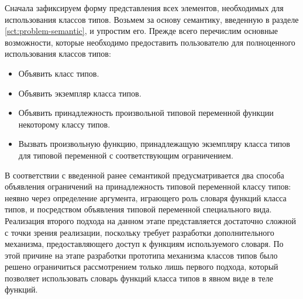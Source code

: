 Сначала зафиксируем форму представления всех элементов, необходимых для использования классов типов. Возьмем за основу семантику, введенную в разделе \ref{sct:problem-semantic}, и упростим его. Прежде всего перечислим основные возможности, которые необходимо предоставить пользователю для полноценного использования классов типов:
\begin{itemize}    
    \item Объявить класс типов.
    \item Объявить экземпляр класса типов.
    \item Объявить принадлежность произвольной типовой переменной функции некоторому классу типов.
    \item Вызвать произвольную функцию, принадлежащую экземпляру класса типов для типовой переменной с соответствующим ограничением.   
\end{itemize}
В соответствии с введенной ранее семантикой предусматривается два способа объявления ограничений на принадлежность типовой переменной классу типов: неявно через определение аргумента, играющего роль словаря функций класса типов, и посредством объявления типовой переменной специального вида. Реализация второго подхода на данном этапе представляется достаточно сложной с точки зрения реализации, поскольку требует разработки дополнительного механизма, предоставляющего доступ к функциям используемого словаря. По этой причине на этапе разработки прототипа механизма классов типов было решено ограничиться рассмотрением только лишь первого подхода, который позволяет использовать словарь функций класса типов в явном виде в теле функций.
